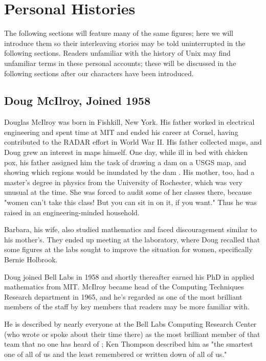
\section{Personal Histories}

The following sections will feature many of the same figures;
here we will introduce them so their interleaving stories may be told
uninterrupted in the following sections.
Readers unfamiliar with the history of Unix may find unfamiliar terms in these
personal accounts; these will be discussed in the following sections after
our characters have been introduced.

\subsection{Doug McIlroy, Joined 1958}

Douglas McIlroy was born in Fishkill, New York.
His father worked in electrical engineering and spent time at
MIT and ended his career at Cornel, having contributed to the RADAR effort in World War II.
His father collected maps, and Doug grew an interest in maps himself.
One day, while ill in bed with chicken pox, his father assigned him the task of drawing
a dam on a USGS map, and showing which regions would be inundated by the dam
\cite{doug_mcilroy_oral_history_2019}.
His mother, too, had a master's degree in physics from the University of Rochester,
which was very unusual at the time. She was forced to audit some of her classes there,
because "women can't take this class! But you can sit in on it, if you want."
Thus he was raised in an engineering-minded household.

Barbara, his wife, also studied mathematics and faced discouragement similar to his mother's.
They ended up meeting at the laboratory, where Doug recalled that some figures at the labs sought
to improve the situation for women, specifically Bernie Holbrook.

Doug joined Bell Labs in 1958 and shortly thereafter earned his
PhD in applied mathematics from MIT.
McIlroy became head of the Computing Techniques Research department in 1965, and he's regarded
as one of the most brilliant members of the staff by key members that readers may be more familiar with.

He is described by nearly everyone at the Bell Labs Computing Research Center
(who wrote or spoke about their time there)
as the most brilliant member of that team that no one has heard of
\cite{kernighan_interviews_thompson_2019}; Ken Thompson described him as
"the smartest one of all of us and the least remembered or written down of all of us."

